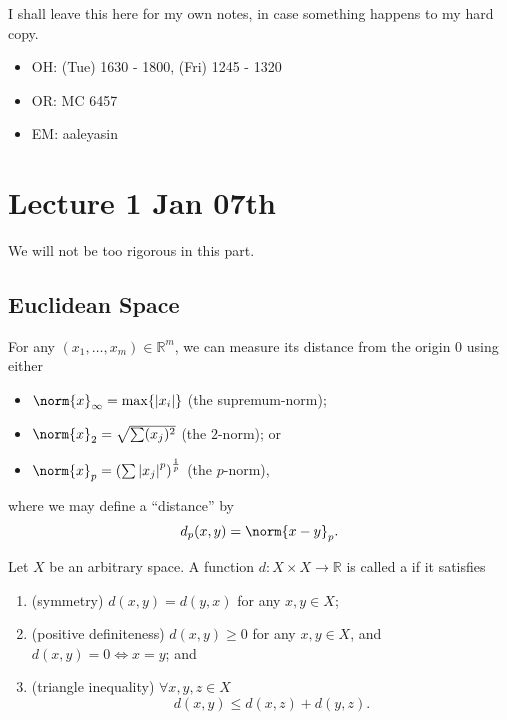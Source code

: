\documentclass[notoc,notitlepage]{tufte-book}
\begin{document}
I shall leave this here for my own notes, in case something happens to my hard copy.

\begin{itemize}
  \item OH: (Tue) 1630 - 1800, (Fri) 1245 - 1320
  \item OR: MC 6457
  \item EM: aaleyasin
\end{itemize}




\chapter{Lecture 1 Jan 07th}%
\label{chp:lecture_1_jan_07th}
\nocite{johnlee2000}

We will not be too rigorous in this part.

\section{Euclidean Space}%
\label{sec:euclidean_space}

For any $(x_1, \ldots, x_m) \in \mathbb{R}^m$, we can measure its distance from the origin $0$ using either
\begin{itemize}
  \item $\norm{x}_\infty = \max \{ \abs{ x_i } \}$ (the supremum-norm);
  \item $\norm{x}_2 = \sqrt{ \sum (x_j)^2 }$ (the $2$-norm); or
  \item $\norm{x}_p = \left( \sum \abs{ x_j }^p \right)^\frac{1}{p}$ (the $p$-norm),
\end{itemize}
where we may define a ``distance'' by
\begin{equation*}
  d_p(x, y) = \norm{ x - y }_p.
\end{equation*}

\begin{defn}[Metric]\label{defn:metric}
  Let $X$ be an arbitrary space. A function $d : X \times X \to \mathbb{R}$ is called a  if it satisfies
  \begin{enumerate}
    \item (symmetry) $d(x, y) = d(y, x)$ for any $x, y \in X$;
    \item (positive definiteness) $d(x, y) \geq 0$ for any $x, y \in X$, and $d(x, y) = 0 \iff x = y$; and
    \item (triangle inequality) $\forall x, y, z \in X$
      \begin{equation*}
        d(x, y) \leq d(x, z) + d(y, z).
      \end{equation*}
  \end{enumerate}
\end{defn}
\end{document}
